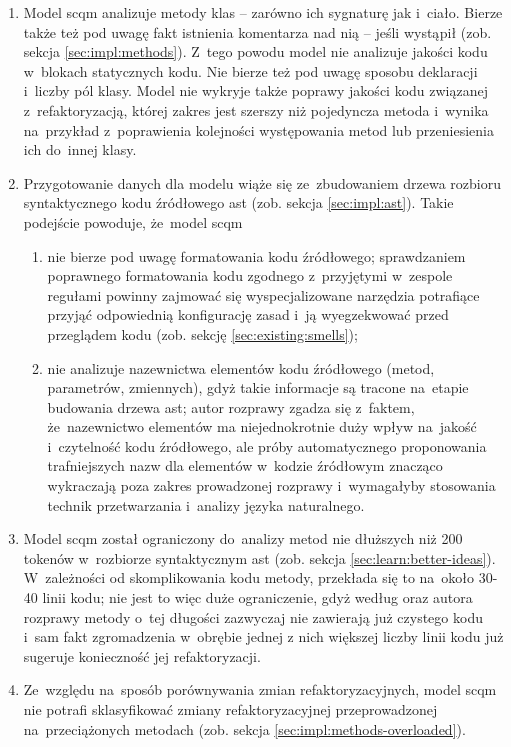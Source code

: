 \documentclass[twoside]{praca}
\begin{document}
\begin{enumerate}
    \item Model \gls{scqm} analizuje metody klas -- zarówno ich sygnaturę jak i~ciało. Bierze także też pod uwagę fakt istnienia komentarza nad nią -- jeśli wystąpił (zob. sekcja \ref{sec:impl:methods}). Z~tego powodu model nie analizuje jakości kodu w~blokach statycznych kodu. Nie bierze też pod uwagę sposobu deklaracji i~liczby pól klasy. Model nie wykryje także poprawy jakości kodu związanej z~refaktoryzacją, której zakres jest szerszy niż pojedyncza metoda i~wynika na~przykład z~poprawienia kolejności występowania metod lub przeniesienia ich do~innej klasy.
    \item Przygotowanie danych dla modelu wiąże się ze~zbudowaniem drzewa rozbioru syntaktycznego kodu źródłowego \gls{ast} (zob. sekcja \ref{sec:impl:ast}). Takie podejście powoduje, że~model \gls{scqm}
    \begin{enumerate}
        \item nie bierze pod uwagę formatowania kodu źródłowego; sprawdzaniem poprawnego formatowania kodu zgodnego z~przyjętymi w~zespole regułami powinny zajmować się wyspecjalizowane narzędzia potrafiące przyjąć odpowiednią konfigurację zasad i~ją wyegzekwować przed przeglądem kodu (zob. sekcję \ref{sec:existing:smells});
        \item nie analizuje nazewnictwa elementów kodu źródłowego (metod, parametrów, zmiennych), gdyż takie informacje są tracone na~etapie budowania drzewa \gls{ast}; autor rozprawy zgadza się z~faktem, że~nazewnictwo elementów ma niejednokrotnie duży wpływ na~jakość i~czytelność kodu źródłowego, ale próby automatycznego proponowania trafniejszych nazw dla elementów w~kodzie źródłowym znacząco wykraczają poza zakres prowadzonej rozprawy i~wymagałyby stosowania technik przetwarzania i~analizy języka naturalnego.
    \end{enumerate}
    \item Model \gls{scqm} został ograniczony do~analizy metod nie dłuższych niż 200 tokenów w~rozbiorze syntaktycznym \gls{ast} (zob. sekcja \ref{sec:learn:better-ideas}). W~zależności od skomplikowania kodu metody, przekłada się to na~około 30-40 linii kodu; nie jest to więc duże ograniczenie, gdyż według \cite{martin2009clean} oraz autora rozprawy metody o~tej długości zazwyczaj nie zawierają już czystego kodu i~sam fakt zgromadzenia w~obrębie jednej z nich większej liczby linii kodu już sugeruje konieczność jej refaktoryzacji.
    \item Ze~względu na~sposób porównywania zmian refaktoryzacyjnych, model \gls{scqm} nie potrafi sklasyfikować zmiany refaktoryzacyjnej przeprowadzonej na~przeciążonych metodach (zob. sekcja \ref{sec:impl:methods-overloaded}).
\end{enumerate}
\end{document}
